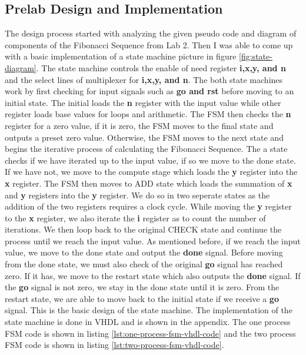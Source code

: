 \documentclass{article}
\begin{document}
\subsection*{Prelab Design and Implementation}
The design process started with analyzing the given pseudo code and diagram of components of the Fibonacci Sequence from Lab 2. Then I was able to come up with a basic implementation of a state machine picture in figure \ref{fig:state-diagram}. The state machine controls the enable of need register \textbf{i,x,y, and n} and the select lines of multiplexer for \textbf{i,x,y, and n}. The both state machines work by first checking for input signals such as \textbf{go and rst} before moving to an initial state. The initial loads the \textbf{n} register with the input value while other register loads base values for loops and arithmetic. The FSM then checks the \textbf{n} register for a zero value, if it is zero, the FSM moves to the final state and outputs a preset zero value. Otherwise, the FSM moves to the next state and begins the iterative process of calculating the Fibonacci Sequence. The a state checks if we have iterated up to the input value, if so we move to the done state. If we have not, we move to the compute stage which loads the \textbf{y} register into the \textbf{x} register. The FSM then moves to ADD state which loads the summation of \textbf{x} and \textbf{y} registers into the \textbf{y} register. We do so in two seperate states as the addition of the two registers requires a clock cycle. While moving the \textbf{y} register to the \textbf{x} register, we also iterate the \textbf{i} register as to count the number of iterations. We then loop back to the original CHECK state and continue the process until we reach the input value. As mentioned before, if we reach the input value, we move to the done state and output the \textbf{done} signal. Before moving from the done state, we must also check of the original \textbf{go} signal has reached zero. If it has, we move to the restart state which also outputs the \textbf{done} signal. If the \textbf{go} signal is not zero, we stay in the done state until it is zero. From the restart state, we are able to move back to the initial state if we receive a \textbf{go} signal. This is the basic design of the state machine. The implementation of the state machine is done in VHDL and is shown in the appendix. The one process FSM code is shown in listing \ref{lst:one-process-fsm-vhdl-code} and the two process FSM code is shown in listing \ref{lst:two-process-fsm-vhdl-code}.
\end{document}
